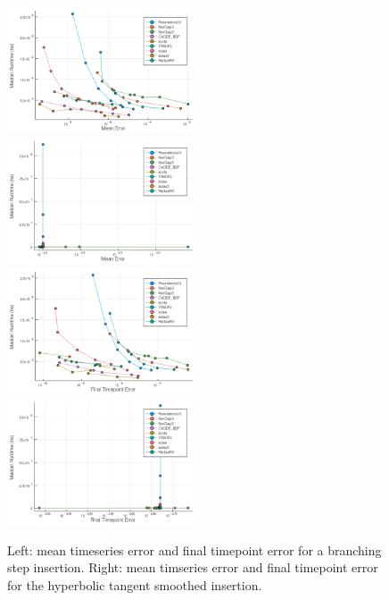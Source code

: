 \documentclass[review,onefignum,onetabnum]{siamart171218}
\begin{document}
\begin{figure}[htb]
  \includegraphics[width=0.5\textwidth]{../plots/work-precision/-low_tolerance_100pcm.png}
  \includegraphics[width=0.5\textwidth]{../plots/work-precision/-low_tolerance_100pcm_tanh.png}
  \includegraphics[width=0.5\textwidth]{../plots/work-precision/final_tp-low_tolerance_100pcm.png}
  \includegraphics[width=0.5\textwidth]{../plots/work-precision/final_tp-low_tolerance_100pcm_tanh.png}
  \caption{Left: mean timeseries error and final timepoint error for a branching step insertion. Right: mean timseries error and final timepoint error for the hyperbolic tangent smoothed insertion. }
  \label{fig:low-tol-both}
\end{figure}
\end{document}
